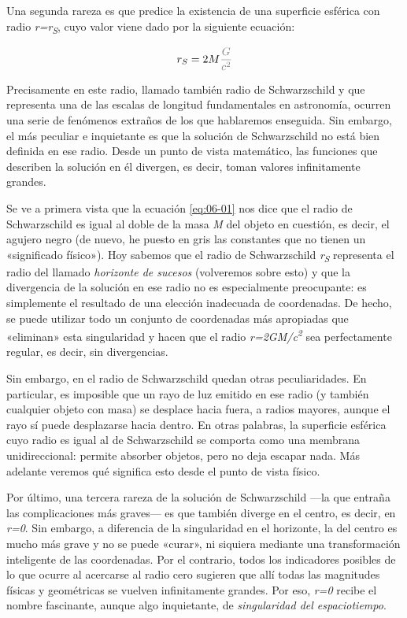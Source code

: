 Una segunda rareza es que predice la existencia de una superficie esférica con radio \emph{r=r\textsubscript{S}}, cuyo valor viene dado por la siguiente ecuación:

\begin{equation}\label{eq:06-01}
r_{S}=2M\textcolor{gray}{\frac{G}{c^{2}}}
\end{equation}

Precisamente en este radio, llamado también radio de Schwarzschild y que representa una de las escalas de longitud fundamentales en astronomía, ocurren una serie de fenómenos extraños de los que hablaremos enseguida. Sin embargo, el más peculiar e inquietante es que la solución de Schwarzschild no está bien definida en ese radio. Desde un punto de vista matemático, las funciones que describen la solución en él divergen, es decir, toman valores infinitamente grandes.

Se ve a primera vista que la ecuación \eqref{eq:06-01} nos dice que el radio de Schwarzschild es igual al doble de la masa \emph{M} del objeto en cuestión, es decir, el agujero negro (de nuevo, he puesto en gris las constantes que no tienen un «significado físico»). Hoy sabemos que el radio de Schwarzschild \emph{r\textsubscript{S}} representa el radio del llamado \emph{horizonte de sucesos} (volveremos sobre esto) y que la divergencia de la solución en ese radio no es especialmente preocupante: es simplemente el resultado de una elección inadecuada de coordenadas. De hecho, se puede utilizar todo un conjunto de coordenadas más apropiadas que «eliminan» esta singularidad y hacen que el radio \emph{r=2GM/c\textsuperscript{2}} sea perfectamente regular, es decir, sin divergencias.

Sin embargo, en el radio de Schwarzschild quedan otras peculiaridades. En particular, es imposible que un rayo de luz emitido en ese radio (y también cualquier objeto con masa) se desplace hacia fuera, a radios mayores, aunque el rayo sí puede desplazarse hacia dentro. En otras palabras, la superficie esférica cuyo radio es igual al de Schwarzschild se comporta como una membrana unidireccional: permite absorber objetos, pero no deja escapar nada. Más adelante veremos qué significa esto desde el punto de vista físico.

Por último, una tercera rareza de la solución de Schwarzschild ---la que entraña las complicaciones más graves--- es que también diverge en el centro, es decir, en \emph{r=0}. Sin embargo, a diferencia de la singularidad en el horizonte, la del centro es mucho más grave y no se puede «curar», ni siquiera mediante una transformación inteligente de las coordenadas. Por el contrario, todos los indicadores posibles de lo que ocurre al acercarse al radio cero sugieren que allí todas las magnitudes físicas y geométricas se vuelven infinitamente grandes. Por eso, \emph{r=0} recibe el nombre fascinante, aunque algo inquietante, de \emph{singularidad del espaciotiempo}.

